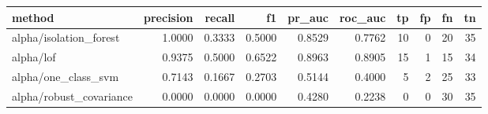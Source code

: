 \begin{tabular}{lrrrrrrrrr}
\hline
method & precision & recall & f1 & pr\_auc & roc\_auc & tp & fp & fn & tn \\
\hline
alpha/isolation\_forest & 1.0000 & 0.3333 & 0.5000 & 0.8529 & 0.7762 & 10 & 0 & 20 & 35 \\
alpha/lof & 0.9375 & 0.5000 & 0.6522 & 0.8963 & 0.8905 & 15 & 1 & 15 & 34 \\
alpha/one\_class\_svm & 0.7143 & 0.1667 & 0.2703 & 0.5144 & 0.4000 & 5 & 2 & 25 & 33 \\
alpha/robust\_covariance & 0.0000 & 0.0000 & 0.0000 & 0.4280 & 0.2238 & 0 & 0 & 30 & 35 \\
\hline
\end{tabular}
